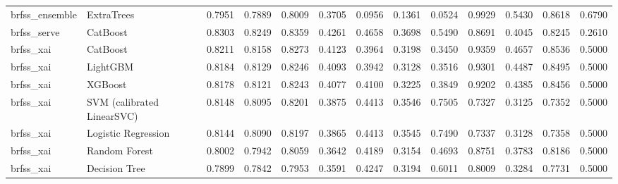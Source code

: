 \begin{tabular}{llrrrrrrrrrrr}
brfss\_ensemble & ExtraTrees & 0.7951 & 0.7889 & 0.8009 & 0.3705 & 0.0956 & 0.1361 & 0.0524 & 0.9929 & 0.5430 & 0.8618 & 0.6790 \\
brfss\_serve & CatBoost & 0.8303 & 0.8249 & 0.8359 & 0.4261 & 0.4658 & 0.3698 & 0.5490 & 0.8691 & 0.4045 & 0.8245 & 0.2610 \\
brfss\_xai & CatBoost & 0.8211 & 0.8158 & 0.8273 & 0.4123 & 0.3964 & 0.3198 & 0.3450 & 0.9359 & 0.4657 & 0.8536 & 0.5000 \\
brfss\_xai & LightGBM & 0.8184 & 0.8129 & 0.8246 & 0.4093 & 0.3942 & 0.3128 & 0.3516 & 0.9301 & 0.4487 & 0.8495 & 0.5000 \\
brfss\_xai & XGBoost & 0.8178 & 0.8121 & 0.8243 & 0.4077 & 0.4100 & 0.3225 & 0.3849 & 0.9202 & 0.4385 & 0.8456 & 0.5000 \\
brfss\_xai & SVM (calibrated LinearSVC) & 0.8148 & 0.8095 & 0.8201 & 0.3875 & 0.4413 & 0.3546 & 0.7505 & 0.7327 & 0.3125 & 0.7352 & 0.5000 \\
brfss\_xai & Logistic Regression & 0.8144 & 0.8090 & 0.8197 & 0.3865 & 0.4413 & 0.3545 & 0.7490 & 0.7337 & 0.3128 & 0.7358 & 0.5000 \\
brfss\_xai & Random Forest & 0.8002 & 0.7942 & 0.8059 & 0.3642 & 0.4189 & 0.3154 & 0.4693 & 0.8751 & 0.3783 & 0.8186 & 0.5000 \\
brfss\_xai & Decision Tree & 0.7899 & 0.7842 & 0.7953 & 0.3591 & 0.4247 & 0.3194 & 0.6011 & 0.8009 & 0.3284 & 0.7731 & 0.5000 \\
\bottomrule
\end{tabular}
